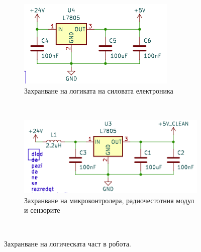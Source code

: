 \begin{figure}[H] 
    \centering
    \begin{subfigure}[h]{0.6\textwidth}
        \includegraphics[width=\textwidth]{images/power-5V.png}
        \caption{Захранване на логиката на силовата електроника}
        \label{fig:power-5V}
    \end{subfigure}
    \\ %
    \begin{subfigure}[h]{0.75\textwidth}
        \includegraphics[width=\textwidth]{images/power-5V-clean.png}
        \caption{Захранване на микроконтролера, радиочестотния модул и сензорите}
        \label{fig:power-5V-clean}
    \end{subfigure}
    ~ %
    \caption{Захранване на логическата част в робота.}
    \label{fig:power-low}
\end{figure}


